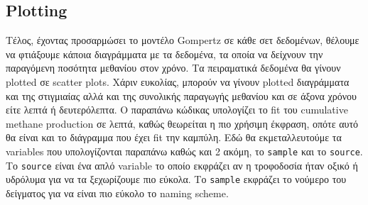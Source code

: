 \documentclass[11pt]{article}
\begin{document}
\subsection{Plotting}
\label{sec:orgbd32eba}
Τέλος, έχοντας προσαρμώσει το μοντέλο Gompertz σε κάθε σετ δεδομένων, θέλουμε να φτιάξουμε κάποια διαγράμματα με τα δεδομένα, τα οποία να δείχνουν την παραγόμενη ποσότητα μεθανίου στον χρόνο. Τα πειραματικά δεδομένα θα γίνουν plotted σε scatter plots. Χάριν ευκολίας, μπορούν να γίνουν plotted διαγράμματα και της στιγμιαίας αλλά και της συνολικής παραγωγής μεθανίου και σε άξονα χρόνου είτε λεπτά ή δευτερόλεπτα. Ο παραπάνω κώδικας υπολογίζει το fit του cumulative methane production σε λεπτά, καθώς θεωρείται η πιο χρήσιμη έκφραση, οπότε αυτό θα είναι και το διάγραμμα που έχει fit την καμπύλη. Εδώ θα εκμεταλλευτούμε τα variables που υπολογίζονται παραπάνω καθώς και 2 ακόμη, το \texttt{sample} και το \texttt{source}. Το \texttt{source} είναι ένα απλό variable το οποίο εκφράζει αν η τροφοδοσία ήταν οξικό ή υδρόλυμα για να τα ξεχωρίζουμε πιο εύκολα. Το \texttt{sample} εκφράζει το νούμερο του δείγματος για να είναι πιο εύκολο το naming scheme.
\end{document}
